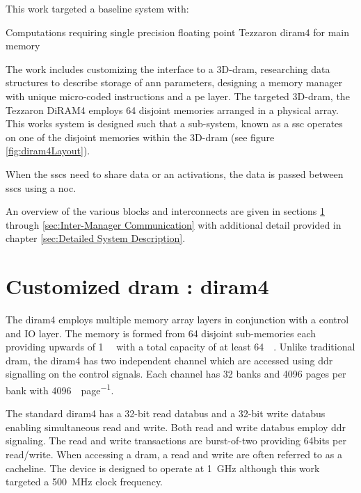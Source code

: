 This work targeted a baseline system with:
\begin{outline}
  \1 Computations requiring single precision floating point
  \1 Tezzaron \acf{diram4} \cite{tezzaron:diram4} for main memory
\end{outline}
The work includes customizing the interface to a 3D-\ac{dram}, researching data structures to describe storage of \ac{ann} parameters, designing a memory manager with unique micro-coded instructions and a \ac{pe} layer.  
The targeted 3D-\ac{dram}, the Tezzaron DiRAM4 employs 64 disjoint memories arranged in a physical array.
This works system is designed such that a sub-system, known as a \ac{ssc} operates on one of the disjoint memories within the 3D-\ac{dram} (see figure \ref{fig:diram4Layout}).

When the \acp{ssc} need to share data or \ac{an} activations, the data is passed between \acp{ssc} using a \ac{noc}.

An overview of the various blocks and interconnects are given in sections \ref{sec:3ddram} through  \ref{sec:Inter-Manager Communication}
with additional detail provided in chapter \ref{sec:Detailed System Description}.

\section{Customized \ac{dram} : \acf{diram4}}
\label{sec:3ddram}
The \ac{diram4} \cite{tezzaron:diram4} employs multiple memory array layers in conjunction with a control and IO layer.
The memory is formed from 64 disjoint sub-memories each providing upwards of \SI[per-mode=symbol]{1}{\giga\bit} with a total capacity of at least \SI[per-mode=symbol]{64}{\giga\bit}.
Unlike traditional \ac{dram}, the \ac{diram4} has two independent channel which are accessed using \ac{ddr} signalling on the control signals.
Each channel has 32 banks and 4096 pages per bank with \SI[per-mode=symbol]{4096}{\bit\per page}.

The standard \ac{diram4} has a 32-bit read databus and a 32-bit write databus enabling simultaneous read and write. Both read and write databus employ \ac{ddr} signaling.
The read and write transactions are burst-of-two providing 64bits per read/write. When accessing a \ac{dram}, a read and write are often referred to as a cacheline.
The device is designed to operate at \SI[per-mode=symbol]{1}{\giga\hertz} although this work targeted a \SI[per-mode=symbol]{500}{\mega\hertz} clock frequency.

